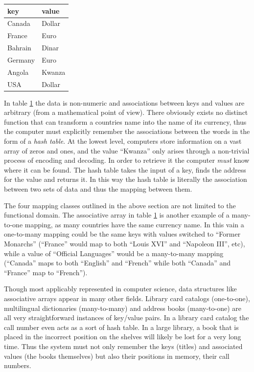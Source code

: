 \begin{table}
	\centering
	\label{tab:key_value_pairs}
	\begin{tabular}{l l}
		\hline\hline
		key&value\\
		\hline
		Canada&Dollar\\
		France&Euro\\
		Bahrain&Dinar\\
		Germany&Euro\\
		Angola&Kwanza\\
		USA&Dollar\\
		\hline
	\end{tabular}
\end{table}

In table \ref{tab:key_value_pairs} the data is non-numeric and associations between keys and values are arbitrary (from a mathematical point of view). There obviously exists no distinct function that can transform a countries name into the name of its currency, thus the computer must explicitly remember the associations between the words in the form of a \emph{hash table}. At the lowest level, computers store information on a vast array of zeros and ones, and the value ``Kwanza'' only arises through a non-trivial process of encoding and decoding. In order to retrieve it the computer \emph{must} know where it can be found. The hash table takes the input of a key, finds the address for the value and returns it. In this way the hash table is literally the association between two sets of data and thus the mapping between them. 

The four mapping classes outlined in the above section are not limited to the functional domain. The associative array in table \ref{tab:key_value_pairs} is another example of a many-to-one mapping, as many countries have the same currency name. In this vain a one-to-many mapping could be the same keys with values switched to ``Former Monarchs'' (``France'' would map to both ``Louis XVI'' and ``Napoleon III'', etc), while a value of ``Official Languages'' would be a many-to-many mapping (``Canada'' maps to both ``English'' and ``French'' while both ``Canada'' and ``France'' map to ``French'').

Though most applicably represented in computer science, data structures like associative arrays appear in many other fields. Library card catalogs (one-to-one), multilingual dictionaries (many-to-many) and address books (many-to-one) are all very straightforward instances of key/value pairs. In a library card catalog the call number even acts as a sort of hash table. In a large library, a book that is placed in the incorrect position on the shelves will likely be lost for a very long time. Thus the system must not only remember the keys (titles) and associated values (the books themselves) but also their positions in memory, their call numbers.

